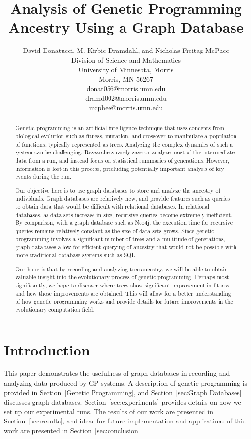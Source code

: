 \documentclass[12pt]{article}
\title{Analysis of Genetic Programming Ancestry Using a Graph Database}
\author{
 		David Donatucci, M. Kirbie Dramdahl, and Nicholas Freitag McPhee\\
        Division of Science and Mathematics\\
        University of Minnesota, Morris\\
        Morris, MN 56267\\
        donat056@morris.umn.edu\\
        dramd002@morris.umn.edu\\
        mcphee@morris.umn.edu\\
}
\date{}
\begin{document}
\pagestyle{plain}

\maketitle

\begin{abstract}

Genetic programming is an artificial intelligence technique that uses concepts from biological evolution such as fitness, mutation, and crossover to manipulate a population of functions, typically represented as trees. Analyzing the complex dynamics of such a system can be challenging. Researchers rarely save or analyze most of the intermediate data from a run, and instead focus on statistical summaries of generations. However, information is lost in this process, precluding potentially important analysis of key events during the run.

Our objective here is to use graph databases to store and analyze the ancestry of individuals. Graph databases are relatively new, and provide features such as queries to obtain data that would be difficult with relational databases. In relational databases, as data sets increase in size, recursive queries become extremely inefficient. By comparison, with a graph database such as Neo4j, the execution time for recursive queries remains relatively constant as the size of data sets grows. Since genetic programming involves a significant number of trees and a multitude of generations, graph databases allow for efficient querying of ancestry that would not be possible with more traditional database systems such as SQL.

Our hope is that by recording and analyzing tree ancestry, we will be able to obtain valuable insight into the evolutionary process of genetic programming. Perhaps most significantly, we hope to discover where trees show significant improvement in fitness and how those improvements are obtained. This will allow for a better understanding of how genetic programming works and provide details for future improvements in the evolutionary computation field.

\end{abstract}

\section{Introduction} \label{sec:intro}

This paper demonstrates the usefulness of graph databases in recording and analyzing data produced by GP systems. A description of genetic programming is provided in Section~\ref{Genetic Programming}, and Section~\ref{sec:Graph Databases} discusses graph databases. Section~\ref{sec:experiments} provides details on how we set up our experimental runs. The results of our work are presented in Section~\ref{sec:results}, and ideas for future implementation and applications of this work are presented in Section~\ref{sec:conclusion}.
\end{document}

